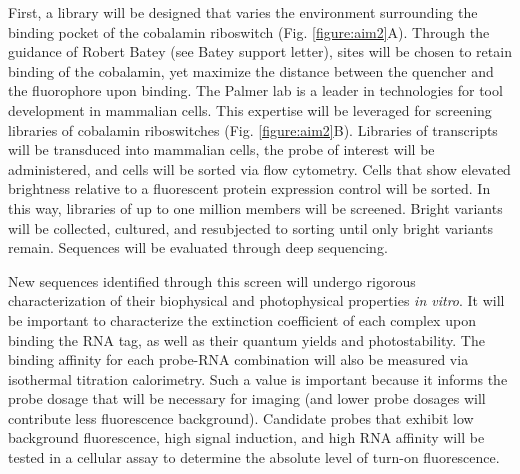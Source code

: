 First, a library will be designed that varies the environment surrounding the binding pocket of the cobalamin riboswitch (Fig. \ref{figure:aim2}A). Through the guidance of Robert Batey (see Batey support letter), sites will be chosen to retain binding of the cobalamin, yet maximize the distance between the quencher and the fluorophore upon binding.\cite{JohnsonJrB12cofactorsdirectly2012}
The Palmer lab is a leader in technologies for tool development in mammalian cells.\cite{FiedlerDropletMicrofluidicFlow2017,DeanHighSpeedMultiparameterPhotophysical2015}
This expertise will be leveraged for screening libraries of cobalamin riboswitches (Fig. \ref{figure:aim2}B). Libraries of transcripts will be transduced into mammalian cells, the probe of interest will be administered, and cells will be sorted via flow cytometry. Cells that show elevated brightness relative to a fluorescent protein expression control will be sorted.
In this way, libraries of up to one million members will be screened. Bright variants will be collected, cultured, and resubjected to sorting until only bright variants remain. Sequences will be evaluated through deep sequencing.

New sequences identified through this screen will undergo rigorous characterization of their biophysical and photophysical properties \textit{in vitro}. It will be important to characterize the extinction coefficient of each complex upon binding the RNA tag, as well as their quantum yields and photostability. The binding affinity for each probe-RNA combination will also be measured via isothermal titration calorimetry. Such a value is important because it informs the probe dosage that will be necessary for imaging (and lower probe dosages will contribute less fluorescence background). Candidate probes that exhibit low background fluorescence, high signal induction, and high RNA affinity will be tested in a cellular assay to determine the absolute level of turn-on fluorescence.

